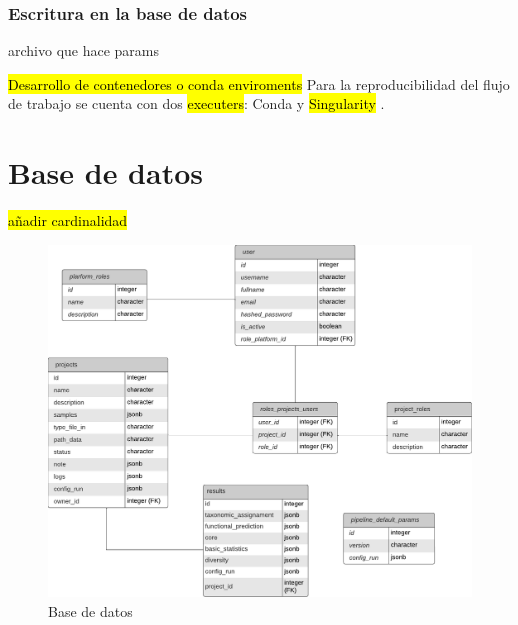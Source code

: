 \subsubsection{Escritura en la base de datos}
archivo que hace params



\hl{Desarrollo de contenedores o conda enviroments}
Para la reproducibilidad del flujo de trabajo se cuenta con dos \hl{executers}: Conda y \hl{Singularity}    .

\section{Base de datos}
\hl{añadir cardinalidad}
\begin{figure}[H]
    \centering
    \includegraphics[width=1\linewidth]{images/nanotax-db.pdf}
    \caption{Base de datos}
    \label{fig:nanotax-db}
\end{figure}


